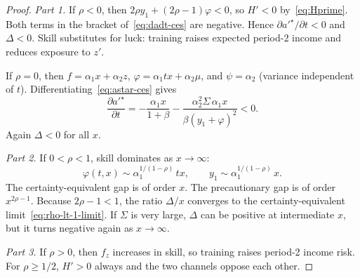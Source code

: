 \documentclass[12pt]{article}
\begin{document}
\begin{proof}
    \emph{Part 1.} If $\rho<0$, then $2\rho y_1+(2\rho-1)\varphi<0$, so $H'<0$ by~\eqref{eq:Hprime}. Both terms in the bracket of~\eqref{eq:dadt-ces} are negative. Hence $\partial a'^{\star}/\partial t<0$ and $\Delta<0$. Skill substitutes for luck: training raises expected period-2 income and reduces exposure to $z'$.

    If $\rho=0$, then $f=\alpha_1 x+\alpha_2 z$, $\varphi=\alpha_1 tx+\alpha_2\mu$, and $\psi=\alpha_2$ (variance independent of $t$). Differentiating~\eqref{eq:astar-ces} gives
    \[
        \frac{\partial a'^{\star}}{\partial t}
        =
        -\frac{\alpha_1 x}{1+\beta}
        -\frac{\alpha_2^2\Sigma\,\alpha_1 x}{\beta(y_1+\varphi)^2}<0.
    \]
    Again $\Delta<0$ for all $x$.

    \emph{Part 2.} If $0<\rho<1$, skill dominates as $x\to\infty$:
    \[
        \varphi(t,x)\sim\alpha_1^{1/(1-\rho)}\,tx,
        \qquad
        y_1\sim\alpha_1^{1/(1-\rho)}\,x.
    \]
    The certainty-equivalent gap is of order $x$. The precautionary gap is of order $x^{2\rho-1}$. Because $2\rho-1<1$, the ratio $\Delta/x$ converges to the certainty-equivalent limit~\eqref{eq:rho-lt-1-limit}. If $\Sigma$ is very large, $\Delta$ can be positive at intermediate $x$, but it turns negative again as $x\to\infty$.

    \emph{Part 3.} If $\rho>0$, then $f_z$ increases in skill, so training raises period-2 income risk. For $\rho\ge 1/2$, $H'>0$ always and the two channels oppose each other.


\end{proof}
\end{document}
